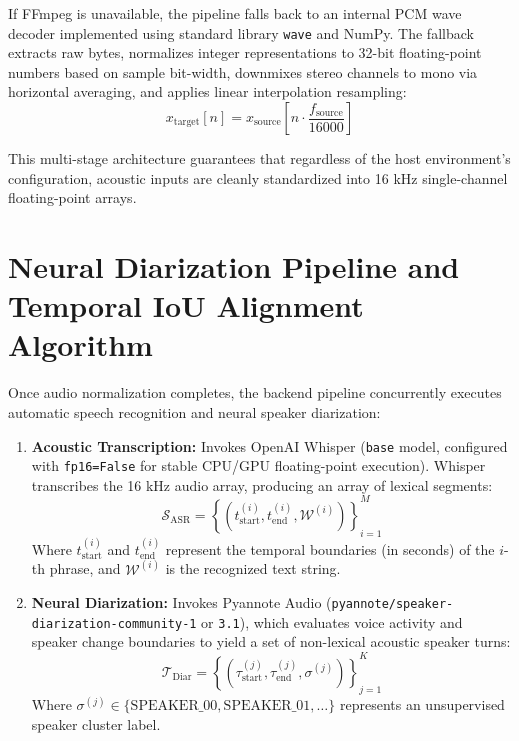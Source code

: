 \documentclass[12pt,oneside,letterpaper]{report}
\numberwithin{equation}{chapter} %
\begin{document}
If FFmpeg is unavailable, the pipeline falls back to an internal PCM wave decoder implemented using standard library \texttt{wave} and NumPy. The fallback extracts raw bytes, normalizes integer representations to 32-bit floating-point numbers based on sample bit-width, downmixes stereo channels to mono via horizontal averaging, and applies linear interpolation resampling:
\begin{equation}
x_{\text{target}}[n] = x_{\text{source}}\left[n \cdot \frac{f_{\text{source}}}{16000}\right]
\label{eq:resampling}
\end{equation}

This multi-stage architecture guarantees that regardless of the host environment's configuration, acoustic inputs are cleanly standardized into 16 kHz single-channel floating-point arrays.

\section{Neural Diarization Pipeline and Temporal IoU Alignment Algorithm}
Once audio normalization completes, the backend pipeline concurrently executes automatic speech recognition and neural speaker diarization:

\begin{enumerate}
    \item \textbf{Acoustic Transcription:} Invokes OpenAI Whisper (\texttt{base} model, configured with \texttt{fp16=False} for stable CPU/GPU floating-point execution). Whisper transcribes the 16 kHz audio array, producing an array of lexical segments:
    \begin{equation}
    \mathcal{S}_{\text{ASR}} = \left\{ \left( t_{\text{start}}^{(i)}, t_{\text{end}}^{(i)}, \mathcal{W}^{(i)} \right) \right\}_{i=1}^M
    \label{eq:asr_segments}
    \end{equation}
    Where $t_{\text{start}}^{(i)}$ and $t_{\text{end}}^{(i)}$ represent the temporal boundaries (in seconds) of the $i$-th phrase, and $\mathcal{W}^{(i)}$ is the recognized text string.

    \item \textbf{Neural Diarization:} Invokes Pyannote Audio (\texttt{pyannote/speaker-diarization-community-1} or \texttt{3.1}), which evaluates voice activity and speaker change boundaries to yield a set of non-lexical acoustic speaker turns:
    \begin{equation}
    \mathcal{T}_{\text{Diar}} = \left\{ \left( \tau_{\text{start}}^{(j)}, \tau_{\text{end}}^{(j)}, \sigma^{(j)} \right) \right\}_{j=1}^K
    \label{eq:diar_turns}
    \end{equation}
    Where $\sigma^{(j)} \in \{\text{SPEAKER\_00}, \text{SPEAKER\_01}, \dots\}$ represents an unsupervised speaker cluster label.
\end{enumerate}
\end{document}
